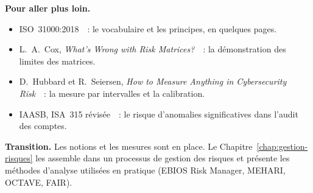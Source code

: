 \bigskip

\begin{boxinfo}
\textbf{Pour aller plus loin.}
\begin{itemize}
    \item ISO~31000:2018~\cite{iso31000_2018}~: le vocabulaire et les
          principes, en quelques pages.
    \item L.~A.~Cox, \textit{What's Wrong with Risk
          Matrices?}~\cite{cox2008matrices}~: la démonstration des
          limites des matrices.
    \item D.~Hubbard et R.~Seiersen, \textit{How to Measure Anything in
          Cybersecurity Risk}~\cite{hubbard2016cyber}~: la mesure par
          intervalles et la calibration.
    \item IAASB, ISA~315 révisée~\cite{iaasb2019isa315}~: le risque
          d'anomalies significatives dans l'audit des comptes.
\end{itemize}
\end{boxinfo}

\begin{boxinfo}
\textbf{Transition.} Les notions et les mesures sont en place. Le
Chapitre~\ref{chap:gestion-risques} les assemble dans un processus de
gestion des risques et présente les méthodes d'analyse utilisées en
pratique (EBIOS Risk Manager, MEHARI, OCTAVE, FAIR).
\end{boxinfo}

